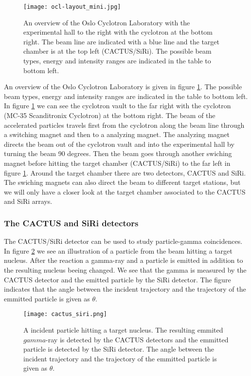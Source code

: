 \documentclass[11pt,a4wide]{article}
\begin{document}
\begin{figure}[htp]
\centering
\texttt{[image: ocl-layout\_mini.jpg]}
\caption{An overview of the Oslo Cyclotron Laboratory with the experimental hall to the right with the cyclotron at the bottom right. The beam line are indicated with a blue line and the target chamber is at the top left (CACTUS/SiRi). The possible beam types, energy and intensity ranges are indicated in the table to bottom left. }
\label{fig:OLC_exp_hall}
\end{figure}

An overview of the Oslo Cyclotron Laboratory is given in figure \ref{fig:OLC_exp_hall}. The possible beam types, energy and intensity ranges are indicated in the table to bottom left. In figure \ref{fig:OLC_exp_hall} we can see the cyclotron vault to the far right with the cyclotron (MC-35 Scanditronix Cyclotron) at the bottom right. The beam of the accelerated particles travels first from the cyclotron along the beam line through a switching magnet and then to a analyzing magnet. The analyzing magnet directs the beam out of the cyclotron vault and into the experimental hall by turning the beam 90 degrees. Then the beam goes through another swiching magnet before hitting the target chamber (CACTUS/SiRi) to the far left in figure \ref{fig:OLC_exp_hall}. Around the target chamber there are two detectors, CACTUS and SiRi. The swiching magnets can also direct the beam to different target stations, but we will only have a closer look at the target chamber associated to the CACTUS and SiRi arrays. 


\subsubsection{The CACTUS and SiRi detectors}
The CACTUS/SiRi detector can be used to study particle-gamma coincidences. In figure \ref{fig: cactus_siri} we see an illustration of a particle from the beam hitting a target nucleus. After the reaction a gamma-ray and a particle is emitted in addition to the resulting nucleus beeing changed. We see that the gamma is measured by the CACTUS detector and the emitted particle by the SiRi detector. The figure indicates that the angle between the incident trajectory and the trajectory of the emmitted particle is given as $\theta$.
\begin{figure}[htp]
\centering
\texttt{[image: cactus\_siri.png]}
\caption{A incident particle hitting a target nucleus. The resulting emmited $gamma$-ray is detected by the CACTUS detectors and the emmitted particle is detected by the SiRi detector. The angle between the incident trajectory and the trajectory of the emmitted particle is given as $\theta$.}
\label{fig: cactus_siri}
\end{figure}
\end{document}
